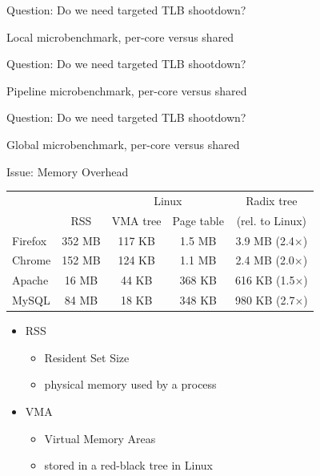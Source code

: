 \documentclass[aspectratio=169]{beamer}
\newcommand{\bi}{\begin{itemize}}
\newcommand{\ei}{\end{itemize}}
\begin{document}
\begin{frame}{Question: Do we need targeted TLB shootdown?}
  \begin{center}
    Local microbenchmark, per-core versus shared\\
    
  \end{center}
\end{frame}

\begin{frame}{Question: Do we need targeted TLB shootdown?}
  \begin{center}
    Pipeline microbenchmark, per-core versus shared\\
    
  \end{center}
\end{frame}

\begin{frame}{Question: Do we need targeted TLB shootdown?}
  \begin{center}
    Global microbenchmark, per-core versus shared\\
    
  \end{center}
\end{frame}

\begin{frame}{Issue: Memory Overhead}
  \begin{center}
    \begin{tabular}{ l | c | c c | c }
              &        & \multicolumn{2}{c|}{Linux} & Radix tree \\
              & RSS    & VMA tree & Page table      & (rel. to Linux) \\
      \hline
      Firefox & 352 MB & 117 KB   & 1.5 MB          & 3.9 MB (2.4$\times$) \\
      Chrome  & 152 MB & 124 KB   & 1.1 MB          & 2.4 MB (2.0$\times$) \\
      Apache  & 16 MB  & 44 KB    & 368 KB          & 616 KB (1.5$\times$) \\
      MySQL   & 84 MB  & 18 KB    & 348 KB          & 980 KB (2.7$\times$) \\
    \end{tabular}
    \vspace{1em}
    \bi
  \item RSS
    \bi
  \item Resident Set Size
  \item physical memory used by a process
    \ei
  \item VMA
    \bi
  \item Virtual Memory Areas
  \item stored in a red-black tree in Linux
    \ei
    \ei
  \end{center}
\end{frame}
\end{document}

